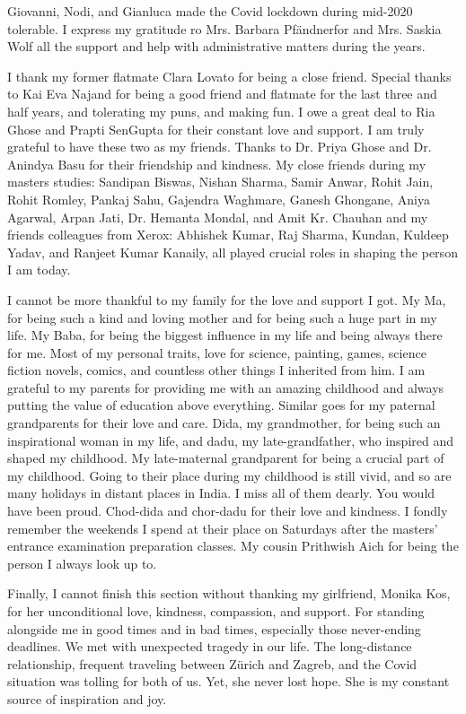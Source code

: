 Giovanni, Nodi, and Gianluca made the Covid lockdown during mid-2020 tolerable. I express my gratitude ro Mrs. Barbara Pf\"andnerfor and Mrs. Saskia Wolf all the support and help with administrative matters during the years. 


I thank my former flatmate Clara Lovato for being a close friend. Special thanks to Kai Eva Najand for being a good friend and flatmate for the last three and half years, and tolerating my puns, and making fun. I owe a great deal to Ria Ghose and Prapti SenGupta for their constant love and support. I am truly grateful to have these two as my friends. Thanks to Dr. Priya Ghose and Dr. Anindya Basu for their friendship and kindness. My close friends during my masters studies: Sandipan Biswas, Nishan Sharma, Samir Anwar, Rohit Jain, Rohit Romley, Pankaj Sahu, Gajendra Waghmare, Ganesh Ghongane, Aniya Agarwal, Arpan Jati, Dr. Hemanta Mondal, and Amit Kr. Chauhan and my friends colleagues from Xerox: Abhishek Kumar, Raj Sharma, Kundan, Kuldeep Yadav, and Ranjeet Kumar Kanaily, all played crucial roles in shaping the person I am today.


I cannot be more thankful to my family for the love and support I got. My Ma, for being such a kind and loving mother and for being such a huge part in my life. My Baba, for being the biggest influence in my life and being always there for me. Most of my personal traits, love for science, painting, games, science fiction novels, comics, and countless other things I inherited from him. I am grateful to my parents for providing me with an amazing childhood and always putting the value of education above everything. Similar goes for my paternal grandparents for their love and care. Dida, my grandmother, for being such an inspirational woman in my life, and dadu, my late-grandfather, who inspired and shaped my childhood. My late-maternal grandparent for being a crucial part of my childhood. Going to their place during my childhood is still vivid, and so are many holidays in distant places in India. I miss all of them dearly. You would have been proud. Chod-dida and chor-dadu for their love and kindness. I fondly remember the weekends I spend at their place on Saturdays after the masters' entrance examination preparation classes. My cousin Prithwish Aich for being the person I always look up to.


Finally, I cannot finish this section without thanking my girlfriend, Monika Kos, for her unconditional love, kindness, compassion, and support. For standing alongside me in good times and in bad times, especially those never-ending deadlines. We met with unexpected tragedy in our life. The long-distance relationship, frequent traveling between Z\"urich and Zagreb, and the Covid situation was tolling for both of us. Yet, she never lost hope. She is my constant source of inspiration and joy.



\endgroup
